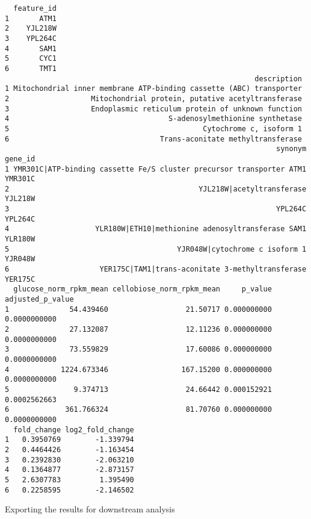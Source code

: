 \documentclass[
  letterpaper,
  DIV=11,
  numbers=noendperiod]{scrartcl}
\newenvironment{Shaded}{\begin{snugshade}}{\end{snugshade}}
\newcommand{\AttributeTok}[1]{\textcolor[rgb]{0.40,0.45,0.13}{#1}}
\newcommand{\ConstantTok}[1]{\textcolor[rgb]{0.56,0.35,0.01}{#1}}
\newcommand{\DecValTok}[1]{\textcolor[rgb]{0.68,0.00,0.00}{#1}}
\newcommand{\FunctionTok}[1]{\textcolor[rgb]{0.28,0.35,0.67}{#1}}
\newcommand{\NormalTok}[1]{\textcolor[rgb]{0.00,0.23,0.31}{#1}}
\newcommand{\SpecialCharTok}[1]{\textcolor[rgb]{0.37,0.37,0.37}{#1}}
\newcommand{\StringTok}[1]{\textcolor[rgb]{0.13,0.47,0.30}{#1}}
\begin{document}
\begin{verbatim}
  feature_id
1       ATM1
2    YJL218W
3    YPL264C
4       SAM1
5       CYC1
6       TMT1
                                                          description
1 Mitochondrial inner membrane ATP-binding cassette (ABC) transporter
2                   Mitochondrial protein, putative acetyltransferase
3                   Endoplasmic reticulum protein of unknown function
4                                     S-adenosylmethionine synthetase
5                                             Cytochrome c, isoform 1
6                                   Trans-aconitate methyltransferase
                                                               synonym gene_id
1 YMR301C|ATP-binding cassette Fe/S cluster precursor transporter ATM1 YMR301C
2                                            YJL218W|acetyltransferase YJL218W
3                                                              YPL264C YPL264C
4                    YLR180W|ETH10|methionine adenosyltransferase SAM1 YLR180W
5                                       YJR048W|cytochrome c isoform 1 YJR048W
6                     YER175C|TAM1|trans-aconitate 3-methyltransferase YER175C
  glucose_norm_rpkm_mean cellobiose_norm_rpkm_mean     p_value adjusted_p_value
1              54.439460                  21.50717 0.000000000     0.0000000000
2              27.132087                  12.11236 0.000000000     0.0000000000
3              73.559829                  17.60086 0.000000000     0.0000000000
4            1224.673346                 167.15200 0.000000000     0.0000000000
5               9.374713                  24.66442 0.000152921     0.0002562663
6             361.766324                  81.70760 0.000000000     0.0000000000
  fold_change log2_fold_change
1   0.3950769        -1.339794
2   0.4464426        -1.163454
3   0.2392830        -2.063210
4   0.1364877        -2.873157
5   2.6307783         1.395490
6   0.2258595        -2.146502
\end{verbatim}

Exporting the results for downstream analysis

\begin{Shaded}
\end{Shaded}
\end{document}
